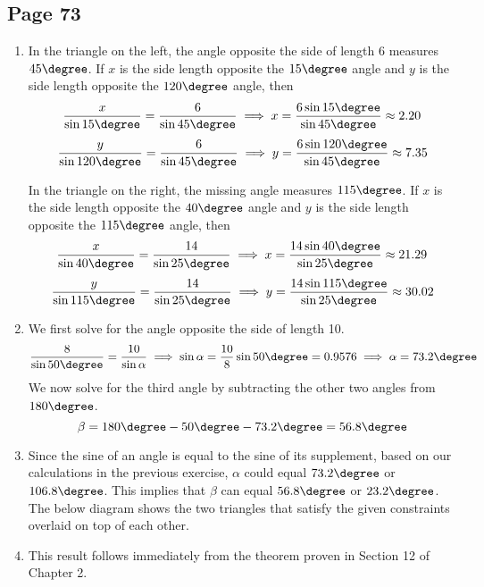 \documentclass{article}
\newenvironment{solutions}[1]
{\subsection*{#1}
 \begin{enumerate}[leftmargin=1.5em]}
{\end{enumerate}}
\newcommand{\solution}{\item}
\begin{document}
\begin{solutions}{Page 73}
\solution %
In the triangle on the left, the angle opposite the side of length 6 measures $45\degree$. If $x$ is the side length opposite the $15\degree$ angle and $y$ is the side length opposite the $120\degree$ angle, then
\[
\dfrac{x}{\sin{15\degree}} = \dfrac{6}{\sin{45\degree}} \implies x = \dfrac{6\sin{15\degree}}{\sin{45\degree}} \approx 2.20
\]
\[
\dfrac{y}{\sin{120\degree}} = \dfrac{6}{\sin{45\degree}} \implies y = \dfrac{6\sin{120\degree}}{\sin{45\degree}} \approx 7.35
\]

In the triangle on the right, the missing angle measures $115\degree$. If $x$ is the side length opposite the $40\degree$ angle and $y$ is the side length opposite the $115\degree$ angle, then
\[
\dfrac{x}{\sin{40\degree}} = \dfrac{14}{\sin{25\degree}} \implies x = \dfrac{14\sin{40\degree}}{\sin{25\degree}} \approx 21.29
\]
\[
\dfrac{y}{\sin{115\degree}} = \dfrac{14}{\sin{25\degree}} \implies y = \dfrac{14\sin{115\degree}}{\sin{25\degree}} \approx 30.02
\]

\solution %
We first solve for the angle opposite the side of length 10.
\[
\dfrac{8}{\sin{50\degree}} = \dfrac{10}{\sin{\alpha}} \implies \sin{\alpha} = \dfrac{10}{8}\sin{50\degree} = 0.9576 \implies \alpha = 73.2\degree
\]
We now solve for the third angle by subtracting the other two angles from $180\degree$.
\[
\beta = 180\degree - 50\degree - 73.2\degree = 56.8\degree
\]

\solution %
Since the sine of an angle is equal to the sine of its supplement, based on our calculations in the previous exercise, $\alpha$ could equal $73.2\degree$ or $106.8\degree$. This implies that $\beta$ can equal $56.8\degree$ or $23.2\degree$. The below diagram shows the two triangles that satisfy the given constraints overlaid on top of each other.
\begin{center}
\end{center}

\solution %
This result follows immediately from the theorem proven in Section 12 of Chapter 2.

\end{solutions}
\end{document}
